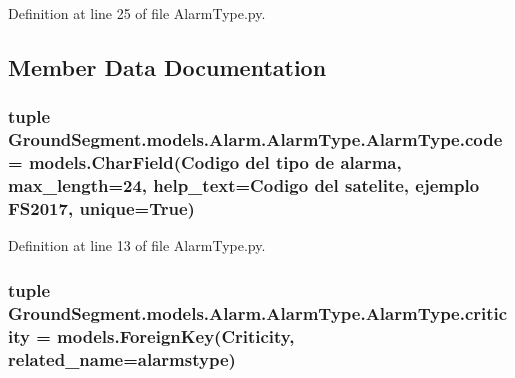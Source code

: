 Definition at line 25 of file Alarm\+Type.\+py.



\subsection{Member Data Documentation}
\hypertarget{class_ground_segment_1_1models_1_1_alarm_1_1_alarm_type_1_1_alarm_type_ac9eaaf8b7552228f2a84b1851b0ec680}{}
\subsubsection[{code}]{\setlength{\rightskip}{0pt plus 5cm}tuple Ground\+Segment.\+models.\+Alarm.\+Alarm\+Type.\+Alarm\+Type.\+code = models.\+Char\+Field(\textquotesingle{}Codigo del tipo de alarma\textquotesingle{}, max\+\_\+length=24, help\+\_\+text=\textquotesingle{}Codigo del satelite, ejemplo F\+S2017\textquotesingle{}, unique=True)\hspace{0.3cm}{\ttfamily [static]}}\label{class_ground_segment_1_1models_1_1_alarm_1_1_alarm_type_1_1_alarm_type_ac9eaaf8b7552228f2a84b1851b0ec680}


Definition at line 13 of file Alarm\+Type.\+py.

\hypertarget{class_ground_segment_1_1models_1_1_alarm_1_1_alarm_type_1_1_alarm_type_a2a764ea6656f351e7bca6d8c0e5ed767}{}
\subsubsection[{criticity}]{\setlength{\rightskip}{0pt plus 5cm}tuple Ground\+Segment.\+models.\+Alarm.\+Alarm\+Type.\+Alarm\+Type.\+criticity = models.\+Foreign\+Key({\bf Criticity}, related\+\_\+name=\textquotesingle{}alarmstype\textquotesingle{})\hspace{0.3cm}{\ttfamily [static]}}\label{class_ground_segment_1_1models_1_1_alarm_1_1_alarm_type_1_1_alarm_type_a2a764ea6656f351e7bca6d8c0e5ed767}


